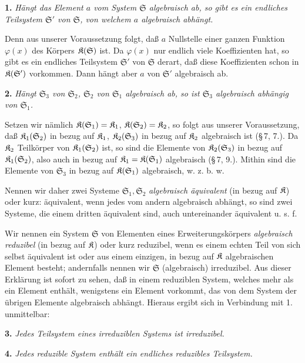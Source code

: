 \textbf{1.} \emph{Hängt das Element $a$ vom System $\mathfrak S$ algebraisch ab, so gibt es ein endliches Teilsystem $\mathfrak S'$ von $\mathfrak S$, von welchem $a$ algebraisch abhängt.}

Denn aus unserer Voraussetzung folgt, daß $a$ Nullstelle einer ganzen Funktion $\varphi(x)$ des Körpers $\mathfrak K(\mathfrak S)$ ist. Da $\varphi(x)$ nur endlich viele Koeffizienten hat, so gibt es ein endliches Teilsystem $\mathfrak S'$ von $\mathfrak S$ derart, daß diese Koeffizienten schon in $\mathfrak K(\mathfrak S')$ vorkommen. Dann hängt aber $a$ von $\mathfrak S'$ algebraisch ab.

\textbf{2.} \emph{Hängt $\mathfrak S_3$ von $\mathfrak S_2$, $\mathfrak S_2$ von $\mathfrak S_1$ algebraisch ab, so ist $\mathfrak S_3$ algebraisch abhängig von $\mathfrak S_1$.}

Setzen wir nämlich $\mathfrak K(\mathfrak S_1)=\mathfrak K_1$, $\mathfrak K(\mathfrak S_2)=\mathfrak K_2$, so folgt aus unserer Voraussetzung, daß $\mathfrak K_1(\mathfrak S_2)$ in bezug auf $\mathfrak K_1$, $\mathfrak K_2(\mathfrak S_3)$ in bezug auf $\mathfrak K_2$ algebraisch ist (\S\,7, 7.). Da $\mathfrak K_2$ Teilkörper von $\mathfrak K_1(\mathfrak S_2)$ ist, so sind die Elemente von $\mathfrak K_2(\mathfrak S_3)$ in bezug auf $\mathfrak K_1(\mathfrak S_2)$, also auch in bezug auf $\mathfrak K_1=\mathfrak K(\mathfrak S_1)$ algebraisch (\S\,7, 9.). Mithin sind die Elemente von $\mathfrak S_3$ in bezug auf $\mathfrak K(\mathfrak S_1)$ algebraisch, w. z. b. w.

Nennen wir daher zwei Systeme $\mathfrak S_1,\mathfrak S_2$ \emph{algebraisch äquivalent} (in bezug auf $\mathfrak K$) oder kurz: äquivalent, wenn jedes vom andern algebraisch abhängt, so sind zwei Systeme, die einem dritten äquivalent sind, auch untereinander äquivalent u. s. f.

Wir nennen ein System $\mathfrak S$ von Elementen eines Erweiterungskörpers \emph{algebraisch reduzibel} (in bezug auf $\mathfrak K$) oder kurz reduzibel, wenn es einem echten Teil von sich selbst äquivalent ist oder aus einem einzigen, in bezug auf $\mathfrak K$ algebraischen Element besteht; andernfalls nennen wir $\mathfrak S$ (algebraisch) irreduzibel. Aus dieser Erklärung ist sofort zu sehen, daß in einem reduziblen System, welches mehr als ein Element enthält, wenigstens ein Element vorkommt, das von dem System der übrigen Elemente algebraisch abhängt. Hieraus ergibt sich in Verbindung mit 1. unmittelbar:

\textbf{3.} \emph{Jedes Teilsystem eines irreduziblen Systems ist irreduzibel.}

\textbf{4.} \emph{Jedes reduzible System enthält ein endliches reduzibles Teilsystem.}

